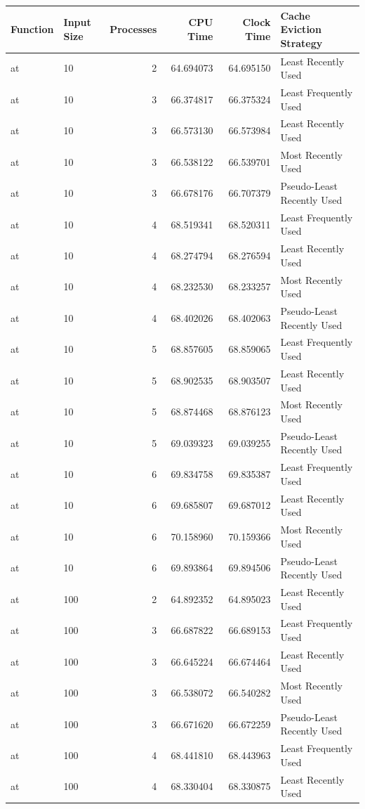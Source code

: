 \begin{tabular}{llrrrl}
\toprule
Function & Input Size & Processes & CPU Time & Clock Time & Cache Eviction Strategy \\
\midrule
at & 10 & 2 & 64.694073 & 64.695150 & Least Recently Used \\
at & 10 & 3 & 66.374817 & 66.375324 & Least Frequently Used \\
at & 10 & 3 & 66.573130 & 66.573984 & Least Recently Used \\
at & 10 & 3 & 66.538122 & 66.539701 & Most Recently Used \\
at & 10 & 3 & 66.678176 & 66.707379 & Pseudo-Least Recently Used \\
at & 10 & 4 & 68.519341 & 68.520311 & Least Frequently Used \\
at & 10 & 4 & 68.274794 & 68.276594 & Least Recently Used \\
at & 10 & 4 & 68.232530 & 68.233257 & Most Recently Used \\
at & 10 & 4 & 68.402026 & 68.402063 & Pseudo-Least Recently Used \\
at & 10 & 5 & 68.857605 & 68.859065 & Least Frequently Used \\
at & 10 & 5 & 68.902535 & 68.903507 & Least Recently Used \\
at & 10 & 5 & 68.874468 & 68.876123 & Most Recently Used \\
at & 10 & 5 & 69.039323 & 69.039255 & Pseudo-Least Recently Used \\
at & 10 & 6 & 69.834758 & 69.835387 & Least Frequently Used \\
at & 10 & 6 & 69.685807 & 69.687012 & Least Recently Used \\
at & 10 & 6 & 70.158960 & 70.159366 & Most Recently Used \\
at & 10 & 6 & 69.893864 & 69.894506 & Pseudo-Least Recently Used \\
at & 100 & 2 & 64.892352 & 64.895023 & Least Recently Used \\
at & 100 & 3 & 66.687822 & 66.689153 & Least Frequently Used \\
at & 100 & 3 & 66.645224 & 66.674464 & Least Recently Used \\
at & 100 & 3 & 66.538072 & 66.540282 & Most Recently Used \\
at & 100 & 3 & 66.671620 & 66.672259 & Pseudo-Least Recently Used \\
at & 100 & 4 & 68.441810 & 68.443963 & Least Frequently Used \\
at & 100 & 4 & 68.330404 & 68.330875 & Least Recently Used \\

\end{tabular}
